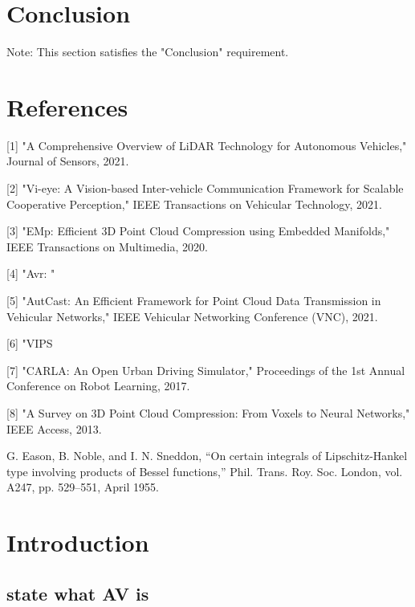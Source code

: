 \documentclass[conference]{IEEEtran}
\begin{document}



\section{Conclusion}
Note: This section satisfies the "Conclusion" requirement.



\section*{References}

    [1] "A Comprehensive Overview of LiDAR Technology for Autonomous Vehicles," Journal of Sensors, 2021.

    [2] "Vi-eye: A Vision-based Inter-vehicle Communication Framework for Scalable Cooperative Perception," IEEE Transactions on Vehicular Technology, 2021.

    [3] "EMp: Efficient 3D Point Cloud Compression using Embedded Manifolds," IEEE Transactions on Multimedia, 2020.

    [4] "Avr: "

[5] "AutCast: An Efficient Framework for Point Cloud Data Transmission in Vehicular Networks," IEEE Vehicular Networking Conference (VNC), 2021.

    [6] "VIPS

[7] "CARLA: An Open Urban Driving Simulator," Proceedings of the 1st Annual Conference on Robot Learning, 2017.

    [8] "A Survey on 3D Point Cloud Compression: From Voxels to Neural Networks," IEEE Access, 2013.
\begin{thebibliography}{00}
     G. Eason, B. Noble, and I. N. Sneddon, ``On certain integrals of Lipschitz-Hankel type involving products of Bessel functions,'' Phil. Trans. Roy. Soc. London, vol. A247, pp. 529--551, April 1955.
\end{thebibliography}



\section{Introduction}
\subsection{state what AV is}
\end{document}
